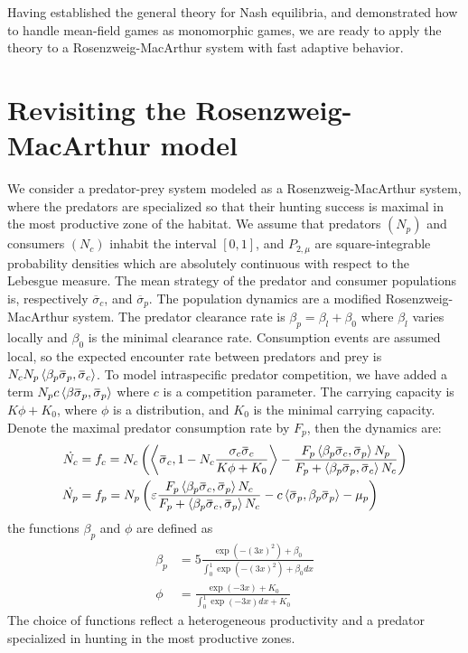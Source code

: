 Having established the general theory for Nash equilibria, and demonstrated how to handle mean-field games as monomorphic games, we are ready to apply the theory to a Rosenzweig-MacArthur system with fast adaptive behavior.
\section{Revisiting the Rosenzweig-MacArthur model}
\label{sec:model_rm}
We consider a predator-prey system modeled as a Rosenzweig-MacArthur system, where the predators are specialized so that their hunting success is maximal in the most productive zone of the habitat.
We assume that predators $(N_p)$ and consumers $(N_c)$ inhabit the interval $[0,1]$, and $P_{2,\mu}$ are square-integrable probability densities which are absolutely continuous with respect to the Lebesgue measure. The mean strategy of the predator and consumer populations is, respectively $\overbar{\sigma}_c$, and $\overbar{\sigma}_p$.
The population dynamics are a modified Rosenzweig-MacArthur system. The predator clearance rate is $\beta_p = \beta_{l} + \beta_0$ where $\beta_l$ varies locally and $\beta_0$ is the minimal clearance rate.
Consumption events are assumed local, so the expected encounter rate between predators and prey is $N_c N_p \ip{\beta_p \overbar{\sigma}_p}{\overbar{\sigma}_c}$. To model intraspecific predator competition, we have added a term $N_p c\ip{\beta \overbar{\sigma}_p}{\overbar{\sigma}_p}$ where $c$ is a competition parameter. The carrying capacity is $K\phi + K_0$, where $\phi$ is a distribution, and $K_0$ is the minimal carrying capacity. Denote the maximal predator consumption rate by $F_p$, then the dynamics are:
\begin{align}
  \dot{N_c} &= f_c = N_c \pa{\ip{\overbar{\sigma}_c}{1-N_c \frac{\sigma_c \overbar{\sigma}_c}{K\phi + K_0}} - \frac{F_p \ip{\beta_p \overbar{\sigma}_c}{\overbar{\sigma}_p} N_p}{F_p + \ip{\beta_p \overbar{\sigma}_p}{\overbar{\sigma}_c} N_c} } \\
  \dot{N_p} &= f_p = N_p \pa{\epsilon \frac{F_p \ip{\beta_p \overbar{\sigma}_c}{\overbar{\sigma}_p} N_c}{F_p + \ip{\beta_p \overbar{\sigma}_c}{\overbar{\sigma}_p} N_c} - c \ip{\overbar{\sigma}_p}{\beta_p \overbar{\sigma}_p}  - \mu_p}
  \label{eq:dynamics}
\end{align}
the functions $\beta_p$ and $\phi$ are defined as
\begin{align}
  \beta_p &= 5 \frac{\exp(-(3 x)^2) + \beta_0}{\int_0^1 \exp(-(3 x)^2) + \beta_0 dx} \\
  \phi &= \frac{\exp(-3 x) + K_0}{\int_0^1 \exp(-3 x) dx + K_0 }
\end{align}
The choice of functions reflect a heterogeneous productivity and a predator specialized in hunting in the most productive zones.
